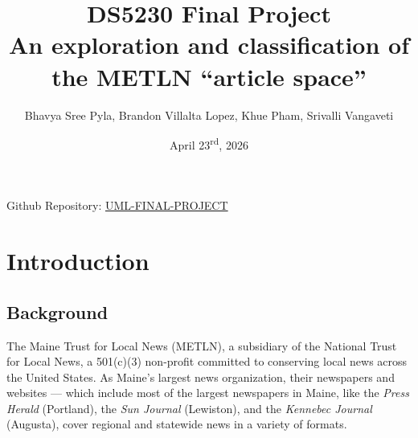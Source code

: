 \documentclass[11pt]{article}
\begin{document}
\title{DS5230 Final Project \\ An exploration and classification of the METLN “article space”}
\author{Bhavya Sree Pyla, Brandon Villalta Lopez, Khue Pham, Srivalli Vangaveti}
\date{April 23\textsuperscript{rd}, 2026}
\maketitle

Github Repository: \href{https://github.com/bhavyasreepyla/UML-FINAL-PROJECT/tree/brandon}{UML-FINAL-PROJECT}

\section{Introduction}
\subsection{Background}
The Maine Trust for Local News (METLN), a subsidiary of the National Trust for Local News, a 501(c)(3) non-profit committed to conserving local news across the United States. As Maine’s largest news organization, their newspapers and websites --- which include most of the largest newspapers in Maine, like the \textit{Press Herald} (Portland), the \textit{Sun Journal} (Lewiston), and the  \textit{Kennebec Journal} (Augusta), cover regional and statewide news in a variety of formats. \cite{metln} \\
\end{document}
